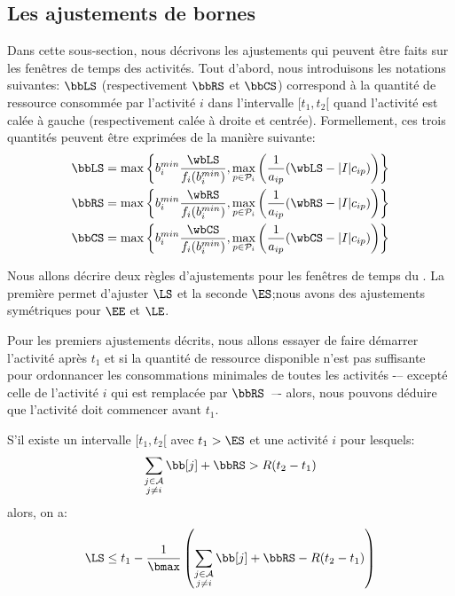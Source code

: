 \subsection{Les ajustements de bornes}
\label{sec:adjustment_tw}

Dans cette sous-section, nous décrivons les ajustements qui peuvent être
faits sur les fenêtres de temps des activités. Tout d'abord, nous
introduisons les notations suivantes: $\bbLS$ (respectivement $\bbRS$
et $\bbCS$) correspond à la quantité de ressource consommée par
l'activité $i$ dans l'intervalle $[t_1,t_2[$ quand l'activité est
calée à gauche (respectivement calée à droite et
centrée). Formellement, ces trois quantités peuvent être exprimées de
la manière suivante:
\begin{align}
  \bbLS&=   \max \left\{b_i^{min} \frac{\wbLS}{f_i(b_i^{min})},
         \max_{ p \in \P_i} \left(\frac{1}{a_{ip}}(\wbLS-|I|c_{ip})\right)\right\}\\
  \bbRS&=   \max \left\{b_i^{min} \frac{\wbRS}{f_i(b_i^{min})},
         \max_{ p \in \P_i} \left(\frac{1}{a_{ip}}(\wbRS-|I|c_{ip})\right)\right\}\\
  \bbCS&=  \max \left\{b_i^{min} \frac{\wbCS}{f_i(b_i^{min})},
         \max_{ p \in \P_i} \left(\frac{1}{a_{ip}}(\wbCS-|I|c_{ip})\right)\right\}
\end{align}

Nous allons décrire deux règles d'ajustements pour les fenêtres de
temps du \CECSP. La première permet d'ajuster $\LS$ et la seconde
$\ES$;nous avons des ajustements symétriques pour $\EE$ et $\LE$. 

Pour les premiers ajustements décrits, nous allons essayer de faire
démarrer l'activité après $t_1$ et si la quantité de ressource
disponible n’est pas suffisante pour ordonnancer les consommations
minimales de toutes les activités -– excepté celle de l’activité $i$ qui
est remplacée par $\bbRS$~–- alors, nous pouvons déduire que l’activité
doit commencer avant $t_1$.

\begin{reg}
  \label{reg:ajust_CECSP}
  S’il existe un intervalle $[t_1 , t_2 [$ avec $t_1 > \ES$ et une
  activité $i$ pour lesquels:
  \[ \sum_{\substack{j \in \A\\ j\neq i}} \bb[j] + \bbRS > R(t_2-t_1)
  \]
  alors, on a:
  \[ \LS \le t_1 - \frac{1}{\bmax}\left(\sum_{\substack{j \in \A\\ j\neq i}} \bb[j] + \bbRS - R(t_2-t_1)\right)
  \]
\end{reg}

